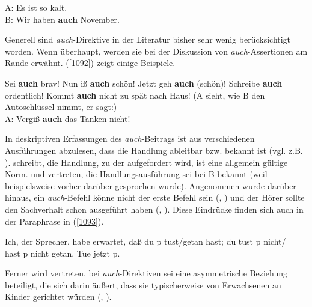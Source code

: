 {\begin{exe}
	\ex\label{1091} 
	A: Es ist so kalt.\\
	B: Wir haben \textbf{auch} November.				     
\end{exe}	
Generell sind \textit{auch}-Direktive in der Literatur bisher sehr wenig berücksichtigt worden. Wenn überhaupt, werden sie bei der Diskussion von \textit{auch}-Assertionen am Rande erwähnt. (\ref{1092}) zeigt einige Beispiele.

\begin{exe}
	\ex\label{1092} 
		\begin{xlist}	
			\ex\label{1092a} Sei \textbf{auch} brav!	
			\hfill\hbox {\citet[97]{Diewald1998}}
			\ex\label{1092b} Nun iß \textbf{auch} schön!
			\hfill\hbox {\citet[158]{Thurmair1989}}
			\ex\label{1092c} Jetzt geh \textbf{auch} (schön)!	
			\hfill\hbox {\citet[60]{Dittmann1980}}
			\ex\label{1092d} Schreibe \textbf{auch} ordentlich!		
			\hfill\hbox {\citet[90]{Helbig1990}}
			\ex\label{1092e} Kommt \textbf{auch} nicht zu spät nach Haus!		
			\hfill\hbox {\citet[58]{Dahl1988}}
			\ex\label{1092f} (A sieht, wie B den Autoschlüssel nimmt, er sagt:)\\
			A: Vergiß \textbf{auch} das Tanken nicht!		
			\hfill\hbox {\citet[50]{Dahl1988}}
		\end{xlist}
\end{exe}
In deskriptiven Erfassungen des \textit{auch}-Beitrags ist aus verschiedenen Ausführungen abzulesen, dass die Handlung ableitbar bzw. bekannt ist (vgl. z.B. \citealt[109]{Burkhardt1982}). \citet[158]{Thurmair1989} schreibt, die Handlung, zu der aufgefordert wird, ist eine \glqq allgemein gültige Norm\grqq{}. \citet[50]{Dahl1988} und \citet[78]{Kwon2005} vertreten, die Handlungsausführung sei bei B bekannt (weil beispielsweise vorher darüber gesprochen wurde). Angenommen wurde darüber hinaus, ein \textit{auch}-Befehl könne nicht der erste Befehl sein (\citealt[50]{Dahl1988}, \citealt[78]{Kwon2005}) und der Hörer sollte den Sachverhalt schon ausgeführt haben (\citealt[90]{Helbig1990}, \citealt[215]{Kwon2005}). Diese Eindrücke finden sich auch in der Paraphrase in (\ref{1093}).

\begin{exe}
	\ex\label{1093} 
	\glq Ich, der Sprecher, habe erwartet, daß du p tust/getan hast; du tust p nicht/\\hast p nicht getan. Tue jetzt p.\grq {} 	
	\hfill\hbox {\citet[60]{Dittmann1980}}
\end{exe}
Ferner wird vertreten, bei \textit{auch}-Direktiven sei eine asymmetrische Beziehung beteiligt, die sich darin äußert, dass sie typischerweise von Erwachsenen an Kinder gerichtet würden (\citealt[158]{Thurmair1989}, \citealt[78]{Kwon2005}). 

}
